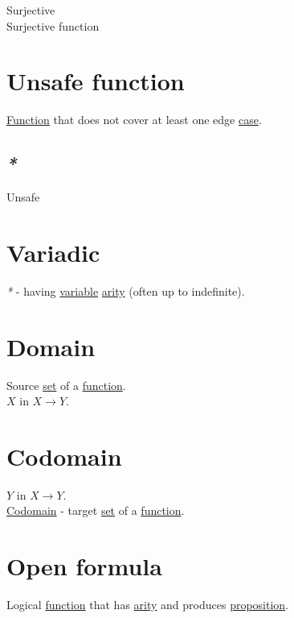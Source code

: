 \documentclass[a4paper,14pt,oneside]{book}
\begin{document}
\label{orgaa24a87}Surjective\\
\label{org87d49ab}Surjective function\\

\section{\label{org468e804}Unsafe function}
\label{sec:orgf4eb2f6}
\hyperref[org8cc2ae4]{Function} that does not cover at least one edge \hyperref[orge2ba09c]{case}.\\

\subsection{\emph{*}}
\label{sec:orgeab239d}

\label{org1627611}Unsafe\\

\section{\label{org47dff41}Variadic}
\label{sec:org84c1188}
\emph{*} - having \hyperref[org029d8fd]{variable} \hyperref[org7bee5cc]{arity} (often up to indefinite).\\

\section{\label{orgeb6ec49}Domain}
\label{sec:orgaf396a0}
Source \hyperref[orge119629]{set} of a \hyperref[org8cc2ae4]{function}.\\
\(X\) in \(X \to Y\).\\

\section{\label{org71c95ef}Codomain}
\label{sec:org14b45a1}
\(Y\) in \(X \to Y\).\\
\hyperref[org71c95ef]{Codomain} - target \hyperref[orge119629]{set} of a \hyperref[org8cc2ae4]{function}.\\

\section{\label{org147c0ee}Open formula}
\label{sec:org32314ad}
Logical \hyperref[org8cc2ae4]{function} that has \hyperref[org7bee5cc]{arity} and produces \hyperref[org19a0c89]{proposition}.\\
\end{document}
